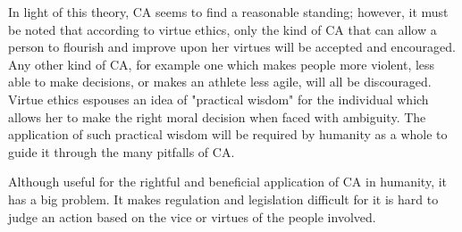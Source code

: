 In light of this theory, CA seems to find a reasonable standing; however, it must be noted that according to virtue ethics, only the kind of CA that can allow a person to flourish and improve upon her virtues will be accepted and encouraged. Any other kind of CA, for example one which makes people more violent, less able to make decisions, or makes an athlete less agile, will all be discouraged. Virtue ethics espouses an idea of "practical wisdom" for the individual which allows her to make the right moral decision when faced with ambiguity. The application of such practical wisdom will be required by humanity as a whole to guide it through the many pitfalls of CA.

Although useful for the rightful and beneficial application of CA in humanity, it has a big problem. It makes regulation and legislation difficult for it is hard to judge an action based on the vice or virtues of the people involved.